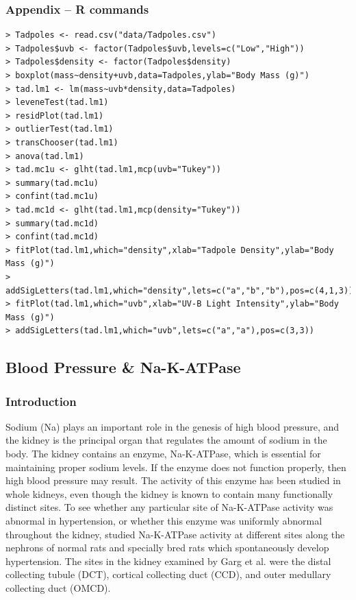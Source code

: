 \documentclass[10pt,openany]{book}\usepackage[]{graphicx}\usepackage[]{color}
\begin{document}
\subsubsection*{Appendix -- R commands}
\begin{Verbatim}[formatcom=\color{red},xleftmargin=5mm,commandchars=\\\{\}]
> Tadpoles <- read.csv("data/Tadpoles.csv")
> Tadpoles$uvb <- factor(Tadpoles$uvb,levels=c("Low","High"))
> Tadpoles$density <- factor(Tadpoles$density)
> boxplot(mass~density+uvb,data=Tadpoles,ylab="Body Mass (g)")
> tad.lm1 <- lm(mass~uvb*density,data=Tadpoles)
> leveneTest(tad.lm1)
> residPlot(tad.lm1)
> outlierTest(tad.lm1)
> transChooser(tad.lm1)
> anova(tad.lm1)
> tad.mc1u <- glht(tad.lm1,mcp(uvb="Tukey"))
> summary(tad.mc1u)
> confint(tad.mc1u)
> tad.mc1d <- glht(tad.lm1,mcp(density="Tukey"))
> summary(tad.mc1d)
> confint(tad.mc1d)
> fitPlot(tad.lm1,which="density",xlab="Tadpole Density",ylab="Body Mass (g)")
> addSigLetters(tad.lm1,which="density",lets=c("a","b","b"),pos=c(4,1,3))
> fitPlot(tad.lm1,which="uvb",xlab="UV-B Light Intensity",ylab="Body Mass (g)")
> addSigLetters(tad.lm1,which="uvb",lets=c("a","a"),pos=c(3,3))
\end{Verbatim}


\subsection{Blood Pressure \& Na-K-ATPase}
\subsubsection*{Introduction}

Sodium (Na) plays an important role in the genesis of high blood pressure, and the kidney is the principal organ that regulates the amount of sodium in the body.  The kidney contains an enzyme, Na-K-ATPase, which is essential for maintaining proper sodium levels.  If the enzyme does not function properly, then high blood pressure may result.  The activity of this enzyme has been studied in whole kidneys, even though the kidney is known to contain many functionally distinct sites.  To see whether any particular site of Na-K-ATPase activity was abnormal in hypertension, or whether this enzyme was uniformly abnormal throughout the kidney, \cite{Gargetal1985} studied Na-K-ATPase activity at different sites along the nephrons of normal rats and specially bred rats which spontaneously develop hypertension.  The sites in the kidney examined by Garg et al. were the distal collecting tubule (DCT), cortical collecting duct (CCD), and outer medullary collecting duct (OMCD).
\end{document}
